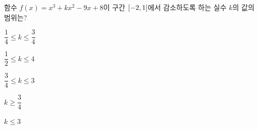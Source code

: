 함수 $f(x)=x^3+kx^2-9x+8$이 구간 $[-2{,}\mkern3mu\mathopen{}1]$에서 감소하도록 하는 실수 $k$의 값의 범위는?
\begin{choicesii}{\rule[-3ex]{0pt}{8ex}$\dfrac{1}{4}\le k\le\dfrac{3}{4}$}{\rule[-3ex]{0pt}{8ex}$\dfrac{1}{2}\le k\le 4$}{\rule[-3ex]{0pt}{8ex}$\dfrac{3}{4}\le k\le 3$}{\rule[-3ex]{0pt}{8ex}$k\ge\dfrac{3}{4}$}{\rule[-3ex]{0pt}{8ex}$k\le 3$}\end{choicesii}
